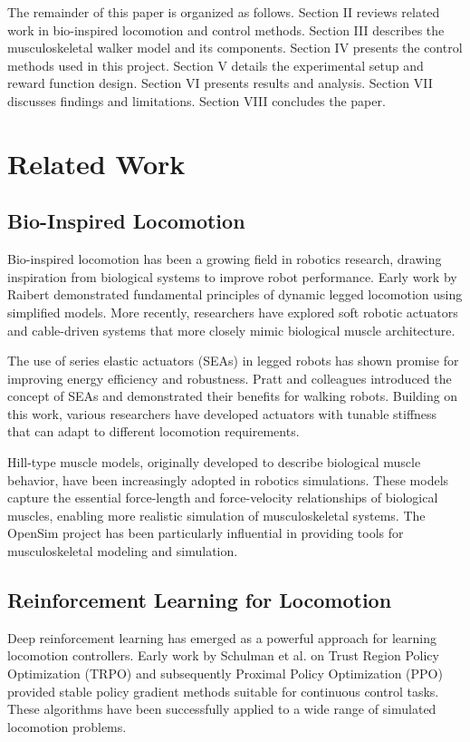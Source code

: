 \documentclass[conference]{IEEEtran}
\begin{document}
The remainder of this paper is organized as follows. Section II reviews related work in bio-inspired locomotion and control methods. Section III describes the musculoskeletal walker model and its components. Section IV presents the control methods used in this project. Section V details the experimental setup and reward function design. Section VI presents results and analysis. Section VII discusses findings and limitations. Section VIII concludes the paper.

\section{Related Work}

\subsection{Bio-Inspired Locomotion}

Bio-inspired locomotion has been a growing field in robotics research, drawing inspiration from biological systems to improve robot performance. Early work by Raibert demonstrated fundamental principles of dynamic legged locomotion using simplified models. More recently, researchers have explored soft robotic actuators and cable-driven systems that more closely mimic biological muscle architecture.

The use of series elastic actuators (SEAs) in legged robots has shown promise for improving energy efficiency and robustness. Pratt and colleagues introduced the concept of SEAs and demonstrated their benefits for walking robots. Building on this work, various researchers have developed actuators with tunable stiffness that can adapt to different locomotion requirements.

Hill-type muscle models, originally developed to describe biological muscle behavior, have been increasingly adopted in robotics simulations. These models capture the essential force-length and force-velocity relationships of biological muscles, enabling more realistic simulation of musculoskeletal systems. The OpenSim project has been particularly influential in providing tools for musculoskeletal modeling and simulation.

\subsection{Reinforcement Learning for Locomotion}

Deep reinforcement learning has emerged as a powerful approach for learning locomotion controllers. Early work by Schulman et al. on Trust Region Policy Optimization (TRPO) and subsequently Proximal Policy Optimization (PPO) provided stable policy gradient methods suitable for continuous control tasks. These algorithms have been successfully applied to a wide range of simulated locomotion problems.
\end{document}
